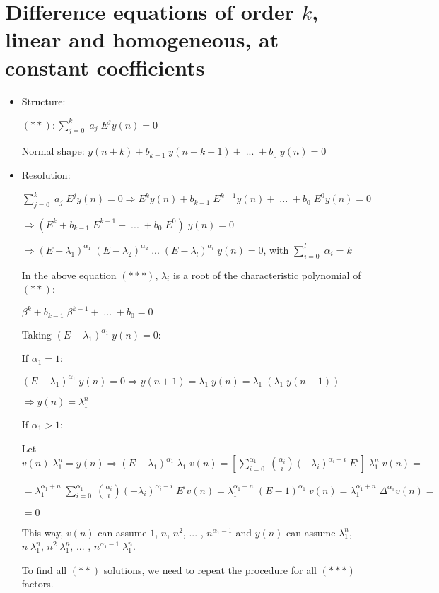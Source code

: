 \documentclass{article}
\begin{document}
\section{Difference equations of order $k$, linear and homogeneous, at constant coefficients}

\begin{itemize}

\item Structure:

$(**): \sum\limits_{j = 0}^{k} \; a_{j} \; E^{j} y(n) = 0$

Normal shape: $y(n + k) + b_{k - 1} \; y(n + k - 1) + \; ... \; + b_{0} \; y(n) = 0$

\item Resolution:

$\sum\limits_{j = 0}^{k} \; a_{j} \; E^{j} y(n) = 0 \Rightarrow E^{k} y(n) + b_{k - 1} \; E^{k - 1} y(n) + \; ... \; + b_{0} \; E^{0} y(n) = 0$

$\Rightarrow (E^{k} + b_{k - 1} \; E^{k - 1} + \; ... \; + b_{0} \; E^{0}) \; y(n) = 0$

$\Rightarrow (E - \lambda_{1})^{\alpha_{1}} \; (E - \lambda_{2})^{\alpha_{2}} \; ... \; (E - \lambda_{l})^{\alpha_{l}} \; y(n) = 0$, with $\sum\limits_{i = 0}^{l} \; \alpha_{i} = k$

In the above equation $(***)$, $\lambda_{i}$ is a root of the characteristic polynomial of $(**)$:

$\beta^{k} + b_{k - 1} \; \beta^{k - 1} + \; ... \; + b_{0} = 0$

Taking $(E - \lambda_{1})^{\alpha_{1}} \; y(n) = 0$:

If $\alpha_{1} = 1$:

$(E - \lambda_{1})^{\alpha_{1}} \; y(n) = 0 \Rightarrow y(n + 1) = \lambda_{1} \; y(n) = \lambda_{1} \; (\lambda_{1} \; y(n - 1))$

$\Rightarrow y(n) = \lambda_{1}^{n}$

If $\alpha_{1} > 1$:

Let $v(n) \; \lambda_{1}^{n} = y(n) \Rightarrow (E - \lambda_{1})^{\alpha_{1}} \; \lambda_{1} \; v(n) = [\sum\limits_{i = 0}^{\alpha_{1}} \; \binom{\alpha_{i}}{i} (-\lambda_{i})^{\alpha_{i} - i} \; E^{i}] \; \lambda_{1}^{n} \; v(n) =$

$= \lambda_{1}^{\alpha_{1} + n} \; \sum\limits_{i = 0}^{\alpha_{1}} \; \binom{\alpha_{i}}{i} (-\lambda_{i})^{\alpha_{i} - i} \; E^{i} v(n) = \lambda_{1}^{\alpha_{1} + n} \; (E - 1)^{\alpha_{1}} \; v(n) = \lambda_{1}^{\alpha_{1} + n} \; \Delta^{\alpha_{1}} v(n) =$

$= 0$

This way, $v(n)$ can assume $1$, $n$, $n^{2}$, ... , $n^{\alpha_{1} - 1}$ and $y(n)$ can assume $\lambda_{1}^{n}$, $n \; \lambda_{1}^{n}$, $n^{2} \; \lambda_{1}^{n}$, ... , $n^{\alpha_{1} - 1} \; \lambda_{1}^{n}$.

To find all $(**)$ solutions, we need to repeat the procedure for all $(***)$ factors.

\end{itemize}
\end{document}

